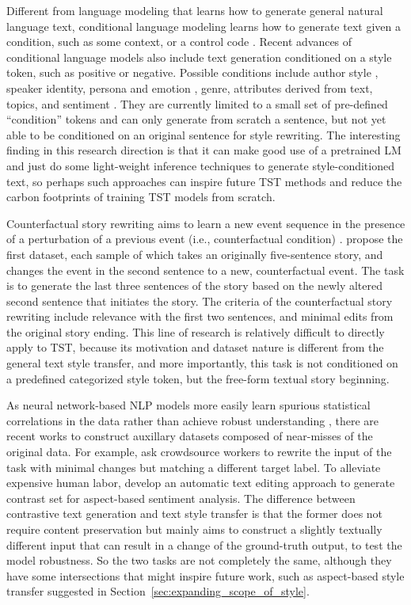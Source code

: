 Different from language modeling that learns how to generate general natural language text, conditional language modeling learns how to generate text given a condition, such as some context, or a control code . Recent advances of conditional language models  also include text generation conditioned on a style token, such as positive or negative. 
Possible conditions include author style , speaker identity, persona and emotion , genre, attributes derived from text, topics, and sentiment .
They are currently limited to a small set of pre-defined ``condition'' tokens and can only generate from scratch a sentence, but not yet able to be conditioned on an original sentence for style rewriting. The interesting finding in this research direction is that it can make good use of a pretrained LM and just do some light-weight inference techniques to generate style-conditioned text, so perhaps such approaches can inspire future TST methods and reduce the carbon footprints of training TST models from scratch.

Counterfactual story rewriting aims to learn a new event sequence in the presence of a perturbation of a previous event (i.e., counterfactual condition) .  propose the first dataset, each sample of which takes an originally five-sentence story, and changes the event in the second sentence to a new, counterfactual event. The task is to generate the last three sentences of the story based on the newly altered second sentence that initiates the story. The criteria of the counterfactual story rewriting include relevance with the first two sentences, and minimal edits from the original story ending. This line of research is relatively difficult to directly apply to TST, because its motivation and dataset nature is different from the general text style transfer, and more importantly, this task is not conditioned on a predefined categorized style token, but the free-form textual story beginning.

As neural network-based NLP models more easily learn spurious statistical correlations in the data rather than achieve robust understanding , there are recent works to construct auxillary datasets composed of near-misses of the original data. For example,  ask crowdsource workers to rewrite the input of the task with minimal changes but matching a different target label. To alleviate expensive human labor,  develop an automatic text editing approach to generate contrast set for aspect-based sentiment analysis. The difference between contrastive text generation and text style transfer is that the former does not require content preservation but mainly aims to construct a slightly textually different input that can result in a change of the ground-truth output, to test the model robustness. So the two tasks are not completely the same, although they have some intersections that might inspire future work, such as aspect-based style transfer suggested in Section~\ref{sec:expanding_scope_of_style}.

